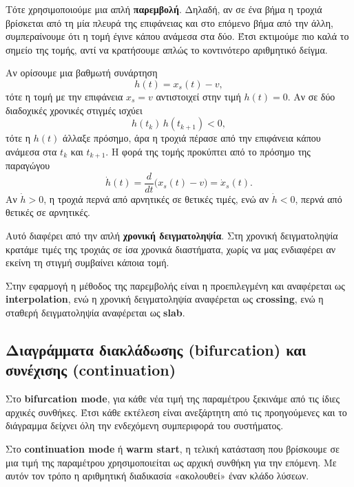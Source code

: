 \documentclass[11pt,a4paper]{report}
\begin{document}
Τότε χρησιμοποιούμε μια απλή \textbf{παρεμβολή}. Δηλαδή, αν σε ένα βήμα η
τροχιά βρίσκεται από τη μία πλευρά της επιφάνειας και στο επόμενο βήμα από την
άλλη, συμπεραίνουμε ότι η τομή έγινε κάπου ανάμεσα στα δύο. Έτσι εκτιμούμε πιο
καλά το σημείο της τομής, αντί να κρατήσουμε απλώς το κοντινότερο αριθμητικό
δείγμα.

Αν ορίσουμε μια βαθμωτή συνάρτηση
\begin{equation}
h(t)=x_s(t)-v,
\end{equation}
τότε η τομή με την επιφάνεια $x_s=v$ αντιστοιχεί στην τιμή $h(t)=0$. Αν σε δύο
διαδοχικές χρονικές στιγμές ισχύει
\begin{equation}
h(t_k)\,h(t_{k+1})<0,
\end{equation}
τότε η $h(t)$ άλλαξε πρόσημο, άρα η τροχιά πέρασε από την επιφάνεια κάπου
ανάμεσα στα $t_k$ και $t_{k+1}$. Η φορά της τομής προκύπτει από το πρόσημο της
παραγώγου
\begin{equation}
\dot h(t)=\frac{d}{dt}\bigl(x_s(t)-v\bigr)=\dot x_s(t).
\end{equation}
Αν $\dot h>0$, η τροχιά περνά από αρνητικές σε θετικές τιμές, ενώ αν
$\dot h<0$, περνά από θετικές σε αρνητικές.

Αυτό διαφέρει από την απλή \textbf{χρονική δειγματοληψία}. Στη χρονική
δειγματοληψία κρατάμε τιμές της τροχιάς σε ίσα χρονικά διαστήματα, χωρίς να μας
ενδιαφέρει αν εκείνη τη στιγμή συμβαίνει κάποια τομή.

Στην εφαρμογή η μέθοδος της παρεμβολής είναι η προεπιλεγμένη και αναφέρεται ως \textbf{interpolation}, ενώ η χρονική δειγματοληψία αναφέρεται ως \textbf{crossing}, 
ενώ η σταθερή δειγματοληψία αναφέρεται ως \textbf{slab}.

\subsection{Διαγράμματα διακλάδωσης (bifurcation) και συνέχισης (continuation)}
\label{subsec:bifurcation-vs-continuation-simple}

Στο \textbf{bifurcation mode}, για κάθε νέα τιμή της παραμέτρου ξεκινάμε από τις
ίδιες αρχικές συνθήκες. Έτσι κάθε εκτέλεση είναι ανεξάρτητη από τις προηγούμενες και
το διάγραμμα δείχνει όλη την ενδεχόμενη συμπεριφορά του συστήματος.

Στο \textbf{continuation mode} ή \textbf{warm start}, η τελική κατάσταση που
βρίσκουμε σε μια τιμή της παραμέτρου χρησιμοποιείται ως αρχική συνθήκη για την
επόμενη. Με αυτόν τον τρόπο η αριθμητική διαδικασία «ακολουθεί» έναν κλάδο
λύσεων.
\end{document}
